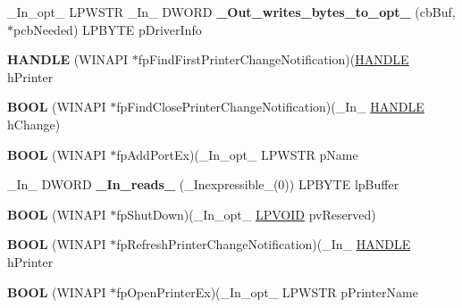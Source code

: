 \begin{DoxyCompactItemize}
\+\_\+\+In\+\_\+opt\+\_\+ L\+P\+W\+S\+TR \+\_\+\+In\+\_\+ D\+W\+O\+RD {\bfseries \+\_\+\+Out\+\_\+writes\+\_\+bytes\+\_\+to\+\_\+opt\+\_\+} (cb\+Buf, $\ast$pcb\+Needed) L\+P\+B\+Y\+TE p\+Driver\+Info
\item 
\mbox{\label{struct___p_r_i_n_t_p_r_o_v_i_d_o_r_a8c5da8800bf5aea7f633591e91246e4c}} 
{\bfseries H\+A\+N\+D\+LE} (W\+I\+N\+A\+PI $\ast$fp\+Find\+First\+Printer\+Change\+Notification)(\hyperlink{interfacevoid}{H\+A\+N\+D\+LE} h\+Printer
\item 
\mbox{\label{struct___p_r_i_n_t_p_r_o_v_i_d_o_r_aec0e90064334bc1b3b4f3d65b70ddb20}} 
{\bfseries B\+O\+OL} (W\+I\+N\+A\+PI $\ast$fp\+Find\+Close\+Printer\+Change\+Notification)(\+\_\+\+In\+\_\+ \hyperlink{interfacevoid}{H\+A\+N\+D\+LE} h\+Change)
\item 
\mbox{\label{struct___p_r_i_n_t_p_r_o_v_i_d_o_r_abaab4a75c19bf9c79299be30e879f999}} 
{\bfseries B\+O\+OL} (W\+I\+N\+A\+PI $\ast$fp\+Add\+Port\+Ex)(\+\_\+\+In\+\_\+opt\+\_\+ L\+P\+W\+S\+TR p\+Name
\item 
\mbox{\label{struct___p_r_i_n_t_p_r_o_v_i_d_o_r_ae3463596575408f56621c6ea5e468dea}} 
\+\_\+\+In\+\_\+ D\+W\+O\+RD {\bfseries \+\_\+\+In\+\_\+reads\+\_\+} (\+\_\+\+Inexpressible\+\_\+(0)) L\+P\+B\+Y\+TE lp\+Buffer
\item 
\mbox{\label{struct___p_r_i_n_t_p_r_o_v_i_d_o_r_a753e6f2c3dcdb48daa163125df4a9807}} 
{\bfseries B\+O\+OL} (W\+I\+N\+A\+PI $\ast$fp\+Shut\+Down)(\+\_\+\+In\+\_\+opt\+\_\+ \hyperlink{interfacevoid}{L\+P\+V\+O\+ID} pv\+Reserved)
\item 
\mbox{\label{struct___p_r_i_n_t_p_r_o_v_i_d_o_r_af2f362dbada239c01fc264263b7e3483}} 
{\bfseries B\+O\+OL} (W\+I\+N\+A\+PI $\ast$fp\+Refresh\+Printer\+Change\+Notification)(\+\_\+\+In\+\_\+ \hyperlink{interfacevoid}{H\+A\+N\+D\+LE} h\+Printer
\item 
\mbox{\label{struct___p_r_i_n_t_p_r_o_v_i_d_o_r_a98f2880174a61f51f016178da61d1d25}} 
{\bfseries B\+O\+OL} (W\+I\+N\+A\+PI $\ast$fp\+Open\+Printer\+Ex)(\+\_\+\+In\+\_\+opt\+\_\+ L\+P\+W\+S\+TR p\+Printer\+Name

\end{DoxyCompactItemize}
